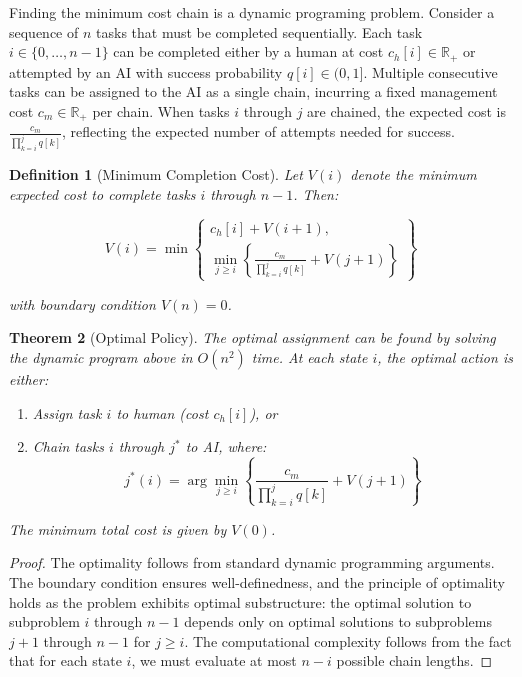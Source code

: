 \documentclass{article}
\newtheorem{theorem}{Theorem}
\newtheorem{definition}[theorem]{Definition}
\begin{document}
Finding the minimum cost chain is a dynamic programing problem.
Consider a sequence of $n$ tasks that must be completed sequentially. 
Each task $i \in \{0,\ldots,n-1\}$ can be completed either by a human at cost $c_h[i] \in \mathbb{R}_+$ or attempted by an AI with success probability $q[i] \in (0,1]$.
Multiple consecutive tasks can be assigned to the AI as a single chain, incurring a fixed management cost $c_m \in \mathbb{R}_+$ per chain. 
When tasks $i$ through $j$ are chained, the expected cost is $\frac{c_m}{\prod_{k=i}^j q[k]}$, reflecting the expected number of attempts needed for success.

\begin{definition}[Minimum Completion Cost]
Let $V(i)$ denote the minimum expected cost to complete tasks $i$ through $n-1$. Then:

\begin{equation}
V(i) = \min\left\{
\begin{array}{l}
c_h[i] + V(i+1), \\[1ex]
\displaystyle\min_{j \geq i} \left\{\frac{c_m}{\prod_{k=i}^j q[k]} + V(j+1)\right\}
\end{array}
\right\}
\end{equation}

with boundary condition $V(n) = 0$.
\end{definition}

\begin{theorem}[Optimal Policy]
The optimal assignment can be found by solving the dynamic program above in $O(n^2)$ time. At each state $i$, the optimal action is either:
\begin{enumerate}
    \item Assign task $i$ to human (cost $c_h[i]$), or
    \item Chain tasks $i$ through $j^*$ to AI, where:
    \begin{equation}
        j^*(i) = \arg\min_{j \geq i} \left\{\frac{c_m}{\prod_{k=i}^j q[k]} + V(j+1)\right\}
    \end{equation}
\end{enumerate}
The minimum total cost is given by $V(0)$.
\end{theorem}

\begin{proof}
The optimality follows from standard dynamic programming arguments. The boundary condition ensures well-definedness, and the principle of optimality holds as the problem exhibits optimal substructure: the optimal solution to subproblem $i$ through $n-1$ depends only on optimal solutions to subproblems $j+1$ through $n-1$ for $j \geq i$. The computational complexity follows from the fact that for each state $i$, we must evaluate at most $n-i$ possible chain lengths.
\end{proof}
  
\end{document}

